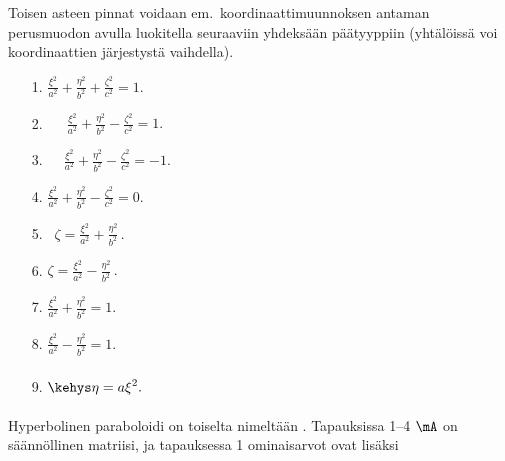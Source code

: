 Toisen asteen pinnat voidaan em.\ koordinaattimuunnoksen antaman perusmuodon avulla luokitella
seuraaviin yhdeksään päätyyppiin (yhtälöissä voi koordinaattien järjestystä vaihdella).
  
 
 
  
\begin{itemize}
\item[1.]  \hspace{38mm}
          $\displaystyle{\frac{\xi^2}{a^2}+\frac{\eta^2}{b^2}+\frac{\zeta^2}{c^2}=1.}$
\item[2.]  
          $\displaystyle{\,\ \quad\frac{\xi^2}{a^2}+\frac{\eta^2}{b^2}-\frac{\zeta^2}{c^2}=1.}$
\item[3.]  
          $\displaystyle{\quad\,\frac{\xi^2}{a^2}+\frac{\eta^2}{b^2}-\frac{\zeta^2}{c^2}=-1.}$
\item[4.]  \hspace{43mm}
          $\displaystyle{\frac{\xi^2}{a^2}+\frac{\eta^2}{b^2}-\frac{\zeta^2}{c^2}=0.}$
\item[5.]  \hspace{16mm}\, 
          $\displaystyle\zeta={\frac{\xi^2}{a^2}+\frac{\eta^2}{b^2}}\,.$
\item[6.]  \hspace{11mm} 
          $\displaystyle{\zeta=\frac{\xi^2}{a^2}-\frac{\eta^2}{b^2}}\,.$
\item[7.]  \hspace{26mm} 
          $\displaystyle{\frac{\xi^2}{a^2}+\frac{\eta^2}{b^2}=1.}$
\item[8.]  \hspace{20mm} 
          $\displaystyle{\frac{\xi^2}{a^2}-\frac{\eta^2}{b^2}=1.}$
\item[9.]  \hspace{22mm} 
          $\displaystyle{\kehys\eta=a\xi^2. \phantom{\frac{\xi^2}{a^2}}}$
\end{itemize}
\vspace{3mm}
%
Hyperbolinen paraboloidi on toiselta nimeltään .
Tapauksissa 1--4 $\mA$ on säännöllinen matriisi, ja tapauksessa 1 ominaisarvot ovat lisäksi
